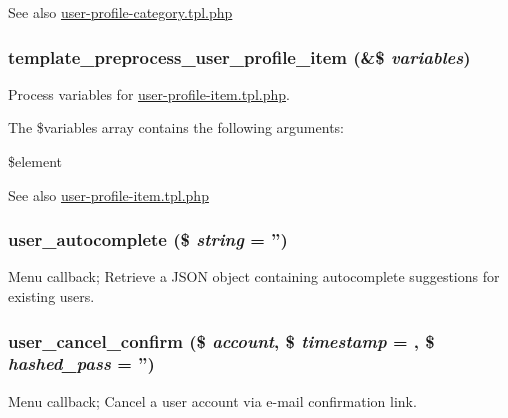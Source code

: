 \begin{DoxySeeAlso}{See also}
\hyperlink{user-profile-category_8tpl_8php}{user-\/profile-\/category.tpl.php} 
\end{DoxySeeAlso}
\hypertarget{user_8pages_8inc_ab6e6ed16b5647c626cc0468506abd3e9}{
\subsubsection[{template\_\-preprocess\_\-user\_\-profile\_\-item}]{\setlength{\rightskip}{0pt plus 5cm}template\_\-preprocess\_\-user\_\-profile\_\-item (\&\$ {\em variables})}}
\label{user_8pages_8inc_ab6e6ed16b5647c626cc0468506abd3e9}
Process variables for \hyperlink{user-profile-item_8tpl_8php}{user-\/profile-\/item.tpl.php}.

The \$variables array contains the following arguments:
\begin{DoxyItemize}
\item \$element
\end{DoxyItemize}

\begin{DoxySeeAlso}{See also}
\hyperlink{user-profile-item_8tpl_8php}{user-\/profile-\/item.tpl.php} 
\end{DoxySeeAlso}
\hypertarget{user_8pages_8inc_a3a77600d6ab7b9af11a3692207b5533a}{
\subsubsection[{user\_\-autocomplete}]{\setlength{\rightskip}{0pt plus 5cm}user\_\-autocomplete (\$ {\em string} = {\ttfamily ''})}}
\label{user_8pages_8inc_a3a77600d6ab7b9af11a3692207b5533a}
Menu callback; Retrieve a JSON object containing autocomplete suggestions for existing users. \hypertarget{user_8pages_8inc_ac3ab92d15edab48212f460e0eabaafb6}{
\subsubsection[{user\_\-cancel\_\-confirm}]{\setlength{\rightskip}{0pt plus 5cm}user\_\-cancel\_\-confirm (\$ {\em account}, \/  \$ {\em timestamp} = {}, \/  \$ {\em hashed\_\-pass} = {\ttfamily ''})}}
\label{user_8pages_8inc_ac3ab92d15edab48212f460e0eabaafb6}
Menu callback; Cancel a user account via e-\/mail confirmation link.

